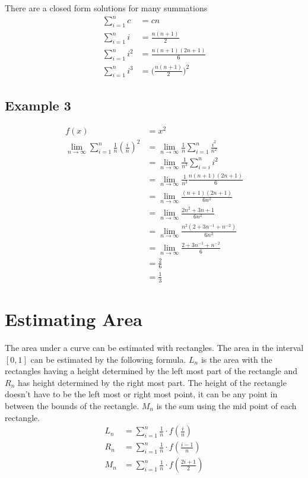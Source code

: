 \documentclass{article}
\theoremstyle{mytheoremstyle}
\theoremstyle{mytheoremstyle}
\theoremstyle{myproblemstyle}
\begin{document}
    There are a closed form solutions for many summations
    \begin{align*}
        \sum_{i=1}^{n} c &= cn \\
        \sum_{i=1}^{n} i &= \frac{n(n+1)}{2} \\
        \sum_{i=1}^{n} i^2 &= \frac{n(n+1)(2n+1)}{6} \\
        \sum_{i=1}^{n} i^3 &= \bigg(\frac{n(n+1)}{2}\bigg)^2
    \end{align*}

    \subsection*{Example 3}
    \begin{align*}
        f(x) &= x^2 \\
        \lim_{n\to \infty} \sum_{i=1}^{n} \frac{1}{n} (\frac{i}{n})^2
        &= \lim_{n\to \infty} \frac{1}{n} \sum_{i=1}^{n} \frac{i^2}{n^2} \\
        &= \lim_{n\to \infty} \frac{1}{n^3} \sum_{i=i}^{n} i^2 \\
        &= \lim_{n\to \infty} \frac{1}{n^3} \frac{n(n+1)(2n+1)}{6} \\
        &= \lim_{n\to \infty} \frac{(n+1)(2n+1)}{6n^2} \\
        &= \lim_{n\to \infty} \frac{2n^2 + 3n + 1}{6n^2} \\
        &= \lim_{n\to \infty} \frac{n^2 (2+ 3n^{-1} + n^{-2})}{6n^2} \\
        &= \lim_{n\to \infty} \frac{2+ 3n^{-1} + n^{-2}}{6} \\
        &= \frac{2}{6} \\
        &= \frac{1}{3}
    \end{align*}

    \section*{Estimating Area}
    The area under a curve can be estimated with rectangles. The area in the
    interval $[0,1]$ can be estimated by the following formula. $L_n$ is the
    area with the rectangles having a height determined by the left most
    part of the rectangle and $R_n$ has height determined by the right most
    part. The height of the rectangle doesn't have to be the left most or
    right most point, it can be any point in between the bounds of the
    rectangle. $M_n$ is the sum using the mid point of each rectangle.
    \begin{align*}
        L_n &= \sum_{i=1}^{n} \frac{1}{n}\cdot f(\frac{i}{n}) \\
        R_n &= \sum_{i=1}^{n} \frac{1}{n}\cdot f(\frac{i-1}{n}) \\
        M_n &= \sum_{i=1}^{n} \frac{1}{n}\cdot f(\frac{2i+1}{2})
    \end{align*}
\end{document}
